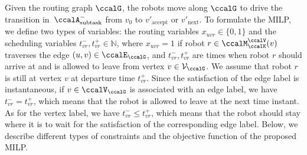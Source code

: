 \documentclass[Afour,sageh,times]{sagej}
\newcommand{\auto}[1]{\ccalA_{\text{#1}}}
\begin{document}
Given the routing graph $\ccalG$, the robots move along $\ccalG$ to drive the transition in~$\auto{subtask}^-$ from $v_0$ to $v'_{\text{accept}}$ or $v'_{\text{next}}$. To formulate the MILP, we define two types of variables: the routing variables $x_{uvr} \in\{0, 1\}$ and the scheduling variables $t^-_{vr}, t^+_{vr} \in \mathbb{N}$, where $x_{uvr}=1$  if robot  $r\in \ccalM^\ccalV_\ccalK(v)$ traverses the edge $(u,v) \in \ccalE_\ccalG$, and $t^-_{vr}, t^+_{vr}$ are times when robot $r$ should arrive at and is allowed to leave from vertex $v \in \mathcal{V}_\ccalG$. We assume that robot $r$ is still at vertex $v$ at departure time $t^+_{vr}$. Since the satisfaction of the edge label is instantaneous, if $v \in \ccalV_\ccalG$ is associated with an edge label, we have
  $t_{vr}^- = t_{vr}^+$, which means that the robot is allowed to leave at the next time instant. As for the vertex label, we have $t_{vr}^-  \leq t_{vr}^+$, which means that the robot should stay where it is to wait for the satisfaction of the corresponding edge label. Below, we describe  different types of constraints and the objective function of the proposed MILP.
\end{document}
